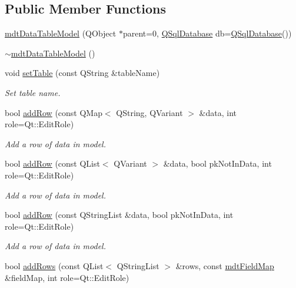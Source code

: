 \subsection*{Public Member Functions}
\begin{DoxyCompactItemize}
\item 
\hyperlink{classmdt_data_table_model_abb59a97c41fea89a44c7b728774ef2ee}{mdt\-Data\-Table\-Model} (Q\-Object $\ast$parent=0, \hyperlink{class_q_sql_database}{Q\-Sql\-Database} db=\hyperlink{class_q_sql_database}{Q\-Sql\-Database}())
\item 
\hyperlink{classmdt_data_table_model_a1d4acd3ab7e8f7759f09c4fb687321b1}{$\sim$mdt\-Data\-Table\-Model} ()
\item 
void \hyperlink{classmdt_data_table_model_a75d4204a5d388756605422110d3afca1}{set\-Table} (const Q\-String \&table\-Name)
\begin{DoxyCompactList}\small\item\em Set table name. \end{DoxyCompactList}\item 
bool \hyperlink{classmdt_data_table_model_a42046e42fdca91fe77fe48e70fed4d18}{add\-Row} (const Q\-Map$<$ Q\-String, Q\-Variant $>$ \&data, int role=Qt\-::\-Edit\-Role)
\begin{DoxyCompactList}\small\item\em Add a row of data in model. \end{DoxyCompactList}\item 
bool \hyperlink{classmdt_data_table_model_a9c83ac307174ed88eb2204b336d38ee2}{add\-Row} (const Q\-List$<$ Q\-Variant $>$ \&data, bool pk\-Not\-In\-Data, int role=Qt\-::\-Edit\-Role)
\begin{DoxyCompactList}\small\item\em Add a row of data in model. \end{DoxyCompactList}\item 
bool \hyperlink{classmdt_data_table_model_a2834bc9663aa478bac5147d2ca7e16ee}{add\-Row} (const Q\-String\-List \&data, bool pk\-Not\-In\-Data, int role=Qt\-::\-Edit\-Role)
\begin{DoxyCompactList}\small\item\em Add a row of data in model. \end{DoxyCompactList}\item 
bool \hyperlink{classmdt_data_table_model_a359a37d1719c0f56110875888466e331}{add\-Rows} (const Q\-List$<$ Q\-String\-List $>$ \&rows, const \hyperlink{classmdt_field_map}{mdt\-Field\-Map} \&field\-Map, int role=Qt\-::\-Edit\-Role)

\end{DoxyCompactItemize}
